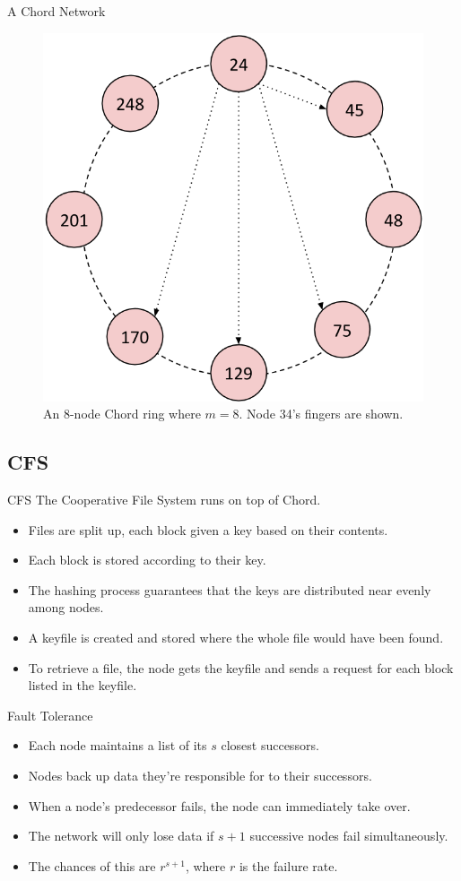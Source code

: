 \documentclass[11pt]{beamer}
\begin{document}
\begin{frame}{A Chord Network}
\begin{figure}
    \includegraphics[width=0.55\linewidth]{CR_overlay}
    \caption{An 8-node Chord ring where $m=8$.  Node 34's fingers are shown.}
    \label{chordreal}
\end{figure}
\end{frame}

\subsection{CFS}
\begin{frame}{CFS}
The Cooperative File System runs on top of Chord.

\begin{itemize}
	\item Files are split up, each block given a key based on their contents.
	\item Each block is stored according to their key.
	\item The hashing process guarantees that the keys are distributed near evenly among nodes.
	\item A keyfile is created and stored where the whole file would have been found.
	\item To retrieve a file, the node gets the keyfile and sends a request for each block listed in the keyfile.
\end{itemize}
\end{frame}
\begin{frame}{Fault Tolerance}

\begin{itemize}
	\item Each node maintains a list of its $s$ closest successors.
	\item Nodes back up data they're responsible for to their successors.
	\item When a node's predecessor fails, the node can immediately take over.
	\item The network will only lose data if $s+1$ successive nodes fail simultaneously.
	\item The chances of this are $r^{s+1}$, where $r$ is the failure rate.
\end{itemize}

\end{frame}
\end{document}
